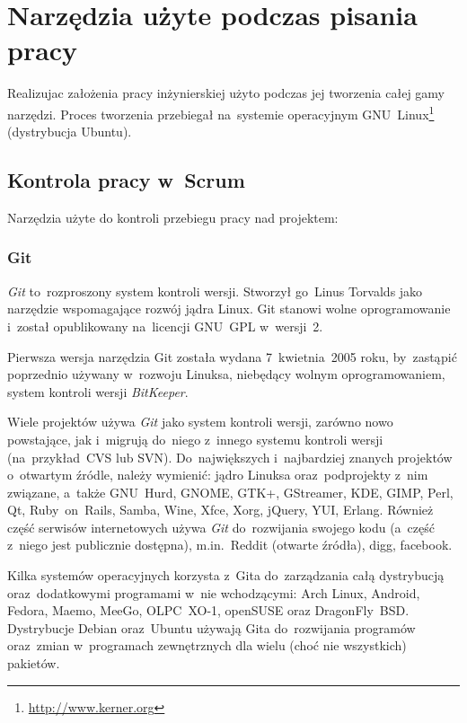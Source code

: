\section{Narzędzia użyte podczas pisania pracy}

Realizujac założenia pracy inżynierskiej użyto podczas jej tworzenia całej gamy narzędzi. Proces tworzenia przebiegał na~systemie operacyjnym GNU~Linux\footnote{\url{http://www.kerner.org}} (dystrybucja Ubuntu\cite{ubuntu}).

\subsection{Kontrola pracy w~Scrum}

Narzędzia użyte do kontroli przebiegu pracy nad projektem:

\subsubsection{Git}

\textit{Git}\cite{git} to~rozproszony system kontroli wersji. Stworzył go~Linus Torvalds jako narzędzie wspomagające rozwój jądra Linux. Git stanowi wolne oprogramowanie i~został opublikowany na~licencji GNU~GPL w~wersji~2.


Pierwsza wersja narzędzia Git została wydana 7~kwietnia~2005 roku, by~zastąpić poprzednio używany w~rozwoju Linuksa, niebędący wolnym oprogramowaniem, system kontroli wersji \textit{BitKeeper}.


Wiele projektów używa \textit{Git} jako system kontroli wersji, zarówno nowo powstające, jak i~migrują do~niego z~innego systemu kontroli wersji (na~przykład~CVS lub SVN). Do~największych i~najbardziej znanych projektów o~otwartym źródle, należy wymienić: jądro Linuksa oraz~podprojekty z~nim związane, a~także GNU~Hurd, GNOME, GTK+, GStreamer, KDE, GIMP, Perl, Qt, Ruby~on~Rails, Samba, Wine, Xfce, Xorg, jQuery, YUI, Erlang. Również część serwisów internetowych używa \textit{Git} do~rozwijania swojego kodu (a~część z~niego jest publicznie dostępna), m.in.~Reddit (otwarte źródła), digg, facebook.


Kilka systemów operacyjnych korzysta z~Gita do~zarządzania całą dystrybucją oraz~dodatkowymi programami w~nie wchodzącymi: Arch Linux, Android, Fedora, Maemo, MeeGo, OLPC~XO-1, openSUSE oraz DragonFly~BSD. Dystrybucje Debian oraz~Ubuntu używają Gita do~rozwijania programów oraz~zmian w~programach zewnętrznych dla wielu (choć nie wszystkich) pakietów.

